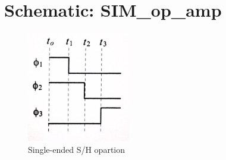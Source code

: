 \documentclass[english, a4paper,11pt]{article}
\begin{document}
\section*{Schematic: SIM\_op\_amp}
\begin{figure}[!ht]
 \centering
   \includegraphics[width=0.4\textwidth]{img/timing_sample_hold.jpg}
   \caption{Single-ended S/H opartion \cite{CMOS-baker}}
   \label{timing}
\end{figure}

\end{document}
